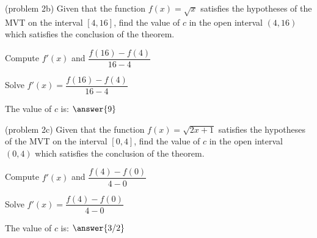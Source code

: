 \documentclass[handout]{ximera}
\begin{document}
\begin{problem}(problem 2b)
  Given that the function $f(x) = \sqrt x$ satisfies the hypotheses of the MVT on the
	interval $[4,16]$, find the value of $c$ in the open interval $(4,16)$ which satisfies 
	the conclusion of the theorem.
	
    \begin{hint}
      Compute $f'(x)$ and $\dfrac{f(16) - f(4)}{16-4}$
    \end{hint}
		\begin{hint}
		  Solve $f'(x) = \dfrac{f(16) - f(4)}{16-4}$
		\end{hint}
		
		The value of $c$ is:
		 $\answer{9}$
\end{problem}


\begin{problem}(problem 2c)
  Given that the function $f(x) = \sqrt{2x+1}$ satisfies the hypotheses of the MVT on the
	interval $[0,4]$, find the value of $c$ in the open interval $(0,4)$ which satisfies 
	the conclusion of the theorem.
	
    \begin{hint}
      Compute $f'(x)$ and $\dfrac{f(4) - f(0)}{4-0}$
    \end{hint}
		\begin{hint}
		  Solve $f'(x) = \dfrac{f(4) - f(0)}{4-0}$
		\end{hint}
		
		The value of $c$ is:
		 $\answer{3/2}$
\end{problem}
\end{document}
